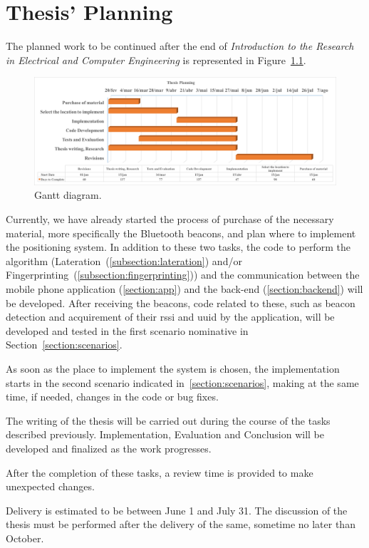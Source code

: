 \chapter{Thesis' Planning}
\label{chapter:planning}

The planned work to be continued after the end of \textit{Introduction to the Research in Electrical and Computer Engineering} is represented in Figure~\ref{fig:gantt}.

\begin{figure}[!htb]
	\centering
	\includegraphics[width=1\textwidth]{Figures/gantt_v2.png}
	\caption[Gantt Diagram]{Gantt diagram.}
	\label{fig:gantt}
\end{figure}

Currently, we have already started the process of purchase of the necessary material, more specifically the Bluetooth beacons, and plan where to implement the positioning system. In addition to these two tasks, the code to perform the algorithm (Lateration~(\ref{subsection:lateration}) and/or Fingerprinting~(\ref{subsection:fingerprinting})) and the communication between the mobile phone application (\ref{section:app}) and the back-end (\ref{section:backend}) will be developed. After receiving the beacons, code related to these, such as beacon detection and acquirement of their \gls{rssi} and \gls{uuid} by the application, will be developed and tested in the first scenario nominative in Section~\ref{section:scenarios}.

As soon as the place to implement the system is chosen, the implementation starts in the second scenario indicated in~\ref{section:scenarios}, making at the same time, if needed, changes in the code or bug fixes.

The writing of the thesis will be carried out during the course of the tasks described previously. Implementation, Evaluation and Conclusion will be developed and finalized as the work progresses.

After the completion of these tasks, a review time is provided to make unexpected changes.

Delivery is estimated to be between June 1 and July 31. The discussion of the thesis must be performed after the delivery of the same, sometime no later than October.
